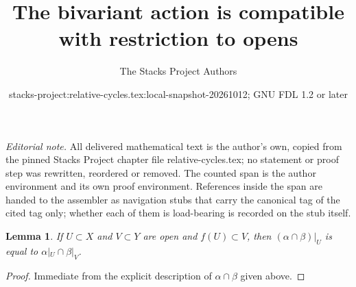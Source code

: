 \documentclass{stacks-project}
\title{The bivariant action is compatible with restriction to opens}
\author{The Stacks Project Authors}
\date{stacks-project:relative-cycles.tex:local-snapshot-20261012; GNU FDL 1.2 or later}
\theoremstyle{plain}
\newtheorem{lemma}[subsection]{Lemma}
\theoremstyle{definition}
\theoremstyle{remark}
\numberwithin{equation}{subsection}
\begin{document}
\maketitle
\setcounter{subsection}{1}
\noindent\textit{Editorial note.} All delivered mathematical text is the author's own, copied from the pinned Stacks Project chapter file relative-cycles.tex; no statement or proof step was rewritten, reordered or removed. The counted span is the author environment and its own proof environment. References inside the span are handed to the assembler as navigation stubs that carry the canonical tag of the cited tag only; whether each of them is load-bearing is recorded on the stub itself.\par\medskip
\begin{lemma}
\label{lemma-action-opens}
If $U \subset X$ and $V \subset Y$ are open and $f(U) \subset V$, then
$(\alpha \cap \beta)|_U$ is equal to $\alpha|_U \cap \beta|_V$.
\end{lemma}

\begin{proof}
Immediate from the explicit description of $\alpha \cap \beta$
given above.
\end{proof}
\end{document}
